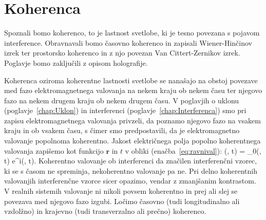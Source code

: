 
\chapter{Koherenca}
\label{chap:Koherenca}
Spoznali bomo koherenco, to je lastnost svetlobe, ki je tesno povezana
s pojavom interference. Obravnavali bomo časovno koherenco in zapisali 
Wiener-Hinčinov izrek ter prostorsko koherenco in z njo povezan 
Van Cittert-Zernikov izrek. Poglavje bomo zaključili z opisom holografije.

Koherenca oziroma koherentne lastnosti svetlobe se nanašajo na obstoj povezave
med fazo elektromagnetnega valovanja na nekem kraju ob nekem času ter njegovo 
fazo na nekem drugem kraju ob nekem drugem času. V poglavjih o 
uklonu (poglavje~\ref{chap:Uklon}) in interferenci (poglavje~\ref{chap:Interferenca})
smo pri zapisu elektromagnetnega valovanja privzeli, da poznamo njegovo fazo 
na vsakem kraju in ob vsakem času, s čimer smo predpostavili, 
da je elektromagnetno valovanje popolnoma koherentno. Jakost 
električnega polja popolno koherentnega valovanja zapišemo kot funkcijo $\mathbf{r}$ in $t$ 
v obliki (enačba~\ref{eq:ravnival}):
\beq
{} (, t) = _0(, t) 
e^{i\phi(, t)}.
\label{eq:08_01}
\eeq
Koherentno valovanje ob interferenci da značilen interferenčni 
vzorec, ki se s časom ne spreminja, nekoherentno valovanje pa ne. Pri  
delno koherentnih valovanjih interferenčne vzorce sicer opazimo, vendar z zmanjšanim
kontrastom. V realnih sistemih valovanje
ni nikoli povsem koherentno in prej ali slej se povezava med njegovo 
fazo izgubi. Ločimo časovno (tudi longitudinalno ali vzdolžno) in krajevno 
(tudi transverzalno ali prečno) koherenco. 

